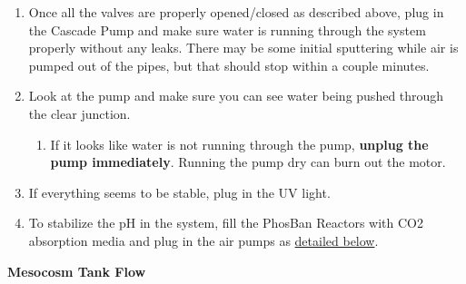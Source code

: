 \documentclass[]{book}
\providecommand{\tightlist}{%
  \setlength{\itemsep}{0pt}\setlength{\parskip}{0pt}}
\begin{document}
\begin{enumerate}
  \begin{enumerate}
  \def\labelenumii{\arabic{enumii}.}
  \tightlist
  \item
    Once all the valves are properly opened/closed as described above,
    plug in the Cascade Pump and make sure water is running through the
    system properly without any leaks. There may be some initial
    sputtering while air is pumped out of the pipes, but that should
    stop within a couple minutes.
  \item
    Look at the pump and make sure you can see water being pushed
    through the clear junction.

    \begin{enumerate}
    \def\labelenumiii{\arabic{enumiii}.}
    \tightlist
    \item
      If it looks like water is not running through the pump,
      \textbf{unplug the pump immediately}. Running the pump dry can
      burn out the motor.
    \end{enumerate}
  \item
    If everything seems to be stable, plug in the UV light.
  \item
    To stabilize the pH in the system, fill the PhosBan Reactors with
    CO2 absorption media and plug in the air pumps as
    \protect\hyperlink{CO2_Scrubber}{detailed below}.
  \end{enumerate}
\end{enumerate}

 \textbf{Mesocosm Tank Flow}
\end{document}
